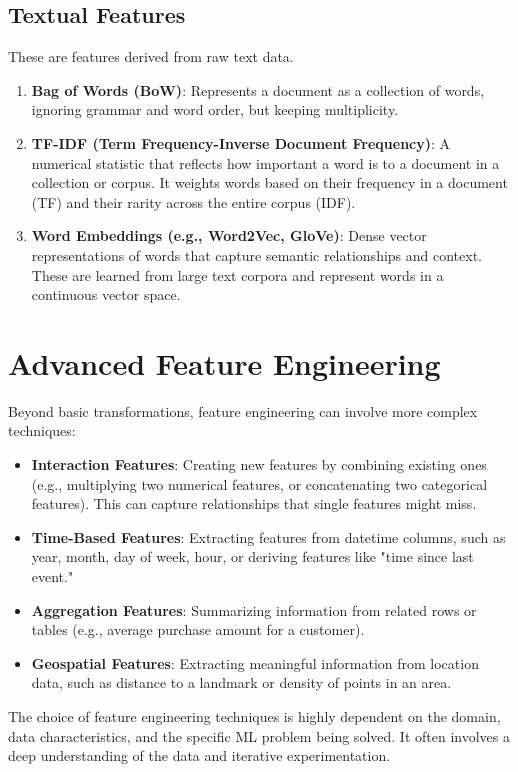 \documentclass{article}
\begin{document}
\subsection*{Textual Features}
These are features derived from raw text data.
\begin{enumerate}
    \item \textbf{Bag of Words (BoW)}: Represents a document as a collection of words, ignoring grammar and word order, but keeping multiplicity.
    \item \textbf{TF-IDF (Term Frequency-Inverse Document Frequency)}: A numerical statistic that reflects how important a word is to a document in a collection or corpus. It weights words based on their frequency in a document (TF) and their rarity across the entire corpus (IDF).
    \item \textbf{Word Embeddings (e.g., Word2Vec, GloVe)}: Dense vector representations of words that capture semantic relationships and context. These are learned from large text corpora and represent words in a continuous vector space.
\end{enumerate}

\section*{Advanced Feature Engineering}
Beyond basic transformations, feature engineering can involve more complex techniques:
\begin{itemize}
    \item \textbf{Interaction Features}: Creating new features by combining existing ones (e.g., multiplying two numerical features, or concatenating two categorical features). This can capture relationships that single features might miss.
    \item \textbf{Time-Based Features}: Extracting features from datetime columns, such as year, month, day of week, hour, or deriving features like "time since last event."
    \item \textbf{Aggregation Features}: Summarizing information from related rows or tables (e.g., average purchase amount for a customer).
    \item \textbf{Geospatial Features}: Extracting meaningful information from location data, such as distance to a landmark or density of points in an area.
\end{itemize}
The choice of feature engineering techniques is highly dependent on the domain, data characteristics, and the specific ML problem being solved. It often involves a deep understanding of the data and iterative experimentation.
\end{document}
